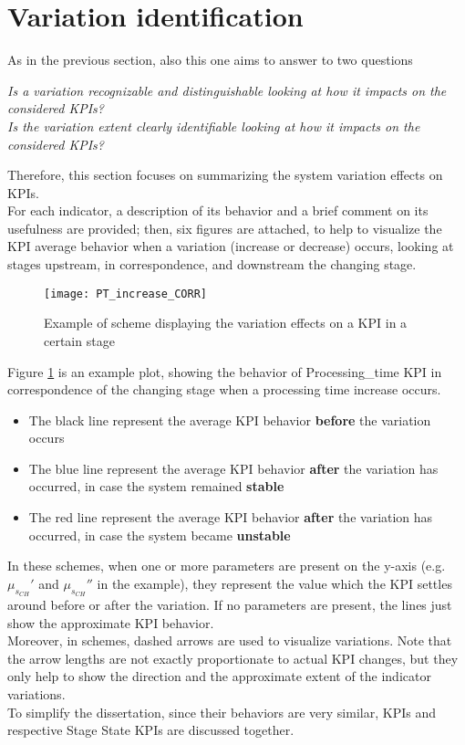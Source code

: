 \section{Variation identification}
As in the previous section, also this one aims to answer to two questions
\begin{center}
\textit{Is a variation recognizable and distinguishable looking at how it impacts on the considered KPIs?}\\
\vspace{3mm}
\textit{Is the variation extent clearly identifiable looking at how it impacts on the considered KPIs?}
\end{center}
Therefore, this section focuses on summarizing the system variation effects on KPIs. \\
For each indicator, a description of its behavior and a brief comment on its usefulness are provided; then, six figures are attached, to help to visualize the KPI average behavior when a variation (increase or decrease) occurs, looking at stages upstream, in correspondence, and downstream the changing stage. 
\begin{figure}[H]
\centering
\texttt{[image: PT\_increase\_CORR]}
\caption{Example of scheme displaying the variation effects on a KPI in a certain stage}
\label{Example of scheme displaying the variation effects on a KPI in a certain stage}   
\end{figure}
Figure \ref{Example of scheme displaying the variation effects on a KPI in a certain stage} is an example plot, showing the behavior of Processing\_time KPI in correspondence of the changing stage when a processing time increase occurs.
\begin{itemize}
\item The black line represent the average KPI behavior \textbf{before} the variation occurs
\item The blue line represent the average KPI behavior \textbf{after} the variation has occurred, in case the system remained \textbf{stable}
\item The red line represent the average KPI behavior \textbf{after} the variation has occurred, in case the system became \textbf{unstable}
\end{itemize}
In these schemes, when one or more parameters are present on the y-axis (e.g. $\mu_{s_{CH}}'$ and $\mu_{s_{CH}}''$ in the example), they represent the value which the KPI settles around before or after the variation. If no parameters are present, the lines just show the approximate KPI behavior.\\
Moreover, in schemes, dashed arrows are used to visualize variations. Note that the arrow lengths are not exactly proportionate to actual KPI changes, but they only help to show the direction and the approximate extent of the indicator variations.\\
To simplify the dissertation, since their behaviors are very similar, KPIs and respective Stage State KPIs are discussed together. 
\newpage
